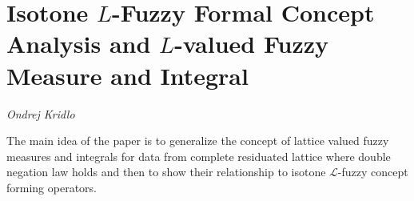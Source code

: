\documentclass[../booklet.tex]{subfiles}
\begin{document}
\section[Isotone $L$-Fuzzy Formal Concept Analysis and $L$-valued Fuzzy Measure and Integral. {\it Ondrej Kridlo}]{Isotone $L$-Fuzzy Formal Concept Analysis and $L$-valued Fuzzy Measure and Integral}

\begin{center}
  {\it Ondrej Kridlo}
\end{center}

\vskip 0.8cm

\newcommand{\LL}{{\mathcal L}}

The main idea of the paper is to generalize the concept of lattice valued fuzzy measures and integrals for data from complete residuated lattice where double negation law holds and then to show their relationship to isotone $\LL$-fuzzy concept forming operators.
\end{document}
